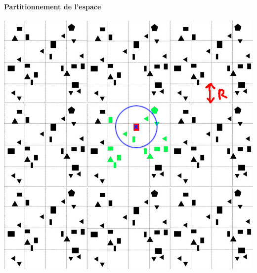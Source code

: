 \begin{frame}
    \frametitle{\trdpti}
    \framesubtitle{Partitionnement de l'espace}
    
    \centering
    \includegraphics[width=0.75\linewidth]{figures/big_uniform_grid_partitionning.png}
    
\end{frame}



